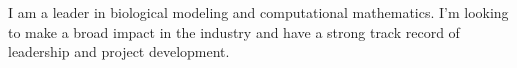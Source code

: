 \break
\begin{cvparagraph}
\par
{I am a leader in biological modeling and computational mathematics. I'm looking to make a broad impact in the industry and have a strong track record of leadership and project development. }
\end{cvparagraph}